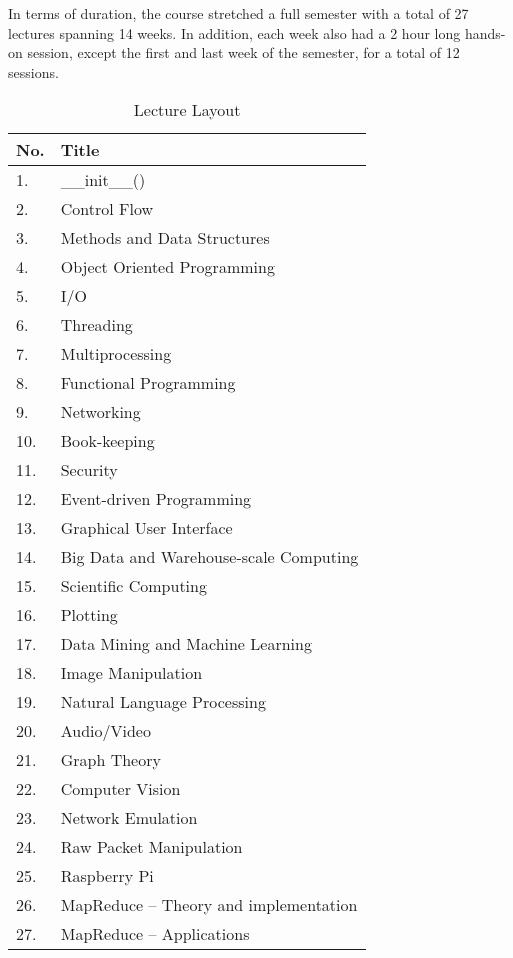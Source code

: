 \documentclass[letterpaper,twocolumn,10pt]{article}
\begin{document}
In terms of duration, the course stretched a full semester with a total of 27
lectures spanning 14 weeks. In addition, each week also had a 2 hour long
hands-on session, except the first and last week of the semester, for a total of
12 sessions.

\begin{table}[ht]
{\begin{tabular}{|l|l|}
\hline
\textbf{No.}   & \textbf{Title}\\\hline
1.  & \_\_init\_\_()\\\hline
2. & Control Flow\\\hline
3. & Methods and Data Structures\\\hline
4. & Object Oriented Programming\\\hline
5. & I/O\\\hline
6. & Threading\\\hline
7. & Multiprocessing\\\hline
8. & Functional Programming\\\hline
9. & Networking\\\hline
10. & Book-keeping\\\hline
11. & Security\\\hline
12. & Event-driven Programming\\\hline
13. & Graphical User Interface\\\hline
14. & Big Data and Warehouse-scale Computing\\\hline
15. & Scientific Computing\\\hline
16. & Plotting\\\hline
17. & Data Mining and Machine Learning\\\hline
18. & Image Manipulation\\\hline
19. & Natural Language Processing\\\hline
20. & Audio/Video\\\hline
21. & Graph Theory\\\hline
22. & Computer Vision\\\hline
23. & Network Emulation\\\hline
24. & Raw Packet Manipulation\\\hline
25. & Raspberry Pi\\\hline
26. & MapReduce -- Theory and implementation\\\hline
27. & MapReduce -- Applications\\\hline
\end{tabular}
\caption{Lecture Layout\label{tab:lectures}}}
\end{table}
\end{document}
